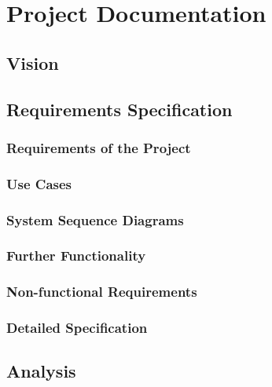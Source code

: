 \documentclass[a4paper,parskip=full]{scrreprt}
\begin{document}
\part{Project Documentation}


\chapter{Vision}


\chapter{Requirements Specification}

\section{Requirements of the Project}

\section{Use Cases}

\section{System Sequence Diagrams}

\section{Further Functionality}

\section{Non-functional Requirements}

\section{Detailed Specification}


\chapter{Analysis}
\end{document}
